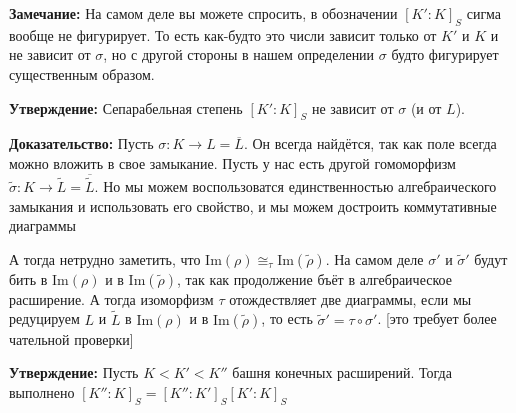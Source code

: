 \documentclass[a4paper, 12pt]{book}
\begin{document}
\textbf{Замечание:} На самом деле вы можете спросить, в обозначении $[K':K]_S$
сигма вообще не фигурирует. То есть как-будто это числи зависит только от $K'$
и $K$ и не зависит от $\sigma$, но с другой стороны в нашем определении $\sigma$
будто фигурирует существенным образом.

\textbf{Утверждение:} Сепарабельная степень $[K':K]_S$ не зависит от
$\sigma$ (и от $L$).

\textbf{Доказательство:} Пусть $\sigma:K\rightarrow L=\overline L$. Он всегда
найдётся, так как поле всегда можно вложить в свое замыкание. Пусть у нас есть
другой гомоморфизм $\widetilde\sigma:K\rightarrow\widetilde L = \overline{
\widetilde L}$. Но мы можем воспользоватся единственностью алгебраического
замыкания и использовать его свойство, и мы можем достроить коммутативные
диаграммы
\begin{center}
\end{center}
А тогда нетрудно заметить, что $\text{Im}(\rho)\cong_\tau\text{Im}(\widetilde\rho)$.
На самом деле $\sigma'$ и $\widetilde\sigma'$ будут бить в $\text{Im}(\rho)$ и в
$\text{Im}(\widetilde\rho)$, так как продолжение бъёт в алгебраическое
расширение. А тогда изоморфизм $\tau$ отождествляет две диаграммы, если мы
редуцируем $L$ и $\widetilde L$ в $\text{Im}(\rho)$ и в $\text{Im}(\widetilde
\rho)$, то есть $\widetilde\sigma'=\tau\circ\sigma'$. [это требует более чательной  проверки]

\textbf{Утверждение:} Пусть $K<K'<K''$ башня конечных расширений. Тогда
выполнено $[K'':K]_S=[K'':K']_S[K':K]_S$
\end{document}
